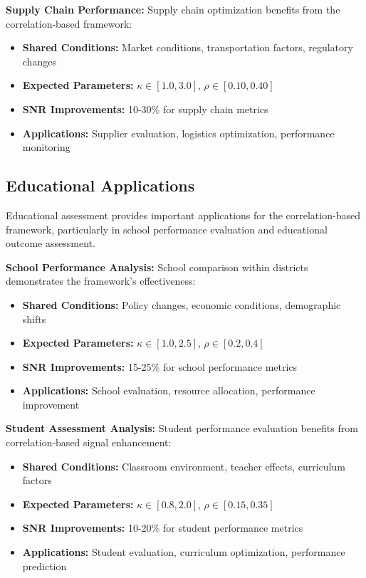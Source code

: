 \textbf{Supply Chain Performance:}
Supply chain optimization benefits from the correlation-based framework:
\begin{itemize}
    \item \textbf{Shared Conditions:} Market conditions, transportation factors, regulatory changes
    \item \textbf{Expected Parameters:} $\kappa \in [1.0, 3.0]$, $\rho \in [0.10, 0.40]$
    \item \textbf{SNR Improvements:} 10-30\% for supply chain metrics
    \item \textbf{Applications:} Supplier evaluation, logistics optimization, performance monitoring
\end{itemize}

\subsection{Educational Applications}

Educational assessment provides important applications for the correlation-based framework, particularly in school performance evaluation and educational outcome assessment.

\textbf{School Performance Analysis:}
School comparison within districts demonstrates the framework's effectiveness:
\begin{itemize}
    \item \textbf{Shared Conditions:} Policy changes, economic conditions, demographic shifts
    \item \textbf{Expected Parameters:} $\kappa \in [1.0, 2.5]$, $\rho \in [0.2, 0.4]$
    \item \textbf{SNR Improvements:} 15-25\% for school performance metrics
    \item \textbf{Applications:} School evaluation, resource allocation, performance improvement
\end{itemize}

\textbf{Student Assessment Analysis:}
Student performance evaluation benefits from correlation-based signal enhancement:
\begin{itemize}
    \item \textbf{Shared Conditions:} Classroom environment, teacher effects, curriculum factors
    \item \textbf{Expected Parameters:} $\kappa \in [0.8, 2.0]$, $\rho \in [0.15, 0.35]$
    \item \textbf{SNR Improvements:} 10-20\% for student performance metrics
    \item \textbf{Applications:} Student evaluation, curriculum optimization, performance prediction
\end{itemize}

